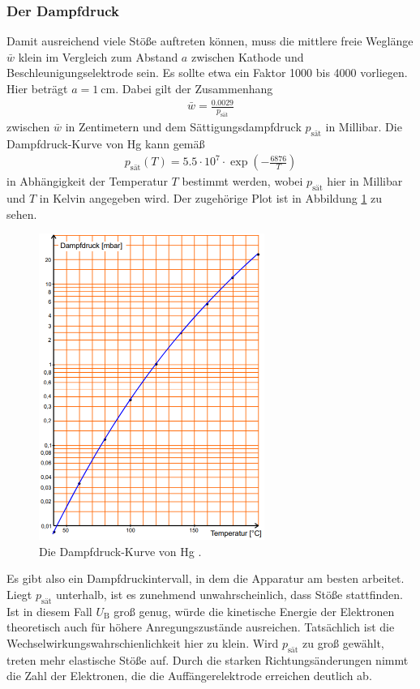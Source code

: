\subsubsection{Der Dampfdruck}
\label{sec:dampfdruck}
Damit ausreichend viele Stöße auftreten können, muss die mittlere freie Weglänge $\bar{w}$ klein im Vergleich zum Abstand $a$ zwischen Kathode und Beschleunigungselektrode sein.
Es sollte etwa ein Faktor 1000 bis 4000 vorliegen.
Hier beträgt $a = \qty{1}{\cm}$.
Dabei gilt der Zusammenhang 
\begin{align}
    \bar{w} = \frac{0.0029}{p_\text{sät}}
    \label{eq:weglaenge}
\end{align} 
zwischen $\bar{w}$ in Zentimetern und dem Sättigungsdampfdruck $p_\text{sät}$ in Millibar.
Die Dampfdruck-Kurve von Hg kann gemäß 
\begin{align}
    p_\text{sät}(T) = \num{5.5} \cdot 10^7 \cdot \exp\left(-\frac{6876}{T}\right)
    \label{eq:dampfdruck}
\end{align}
in Abhängigkeit der Temperatur $T$ bestimmt werden, wobei $p_\text{sät}$ hier in Millibar und $T$ in Kelvin angegeben wird.
Der zugehörige Plot ist in Abbildung \ref{fig:dampfdruck} zu sehen.

\begin{figure}[H]
    \centering
    \includegraphics[height = 10cm]{bilder/dampfdruck.png}
    \caption{Die Dampfdruck-Kurve von Hg \cite{man:v601}.}
    \label{fig:dampfdruck}
\end{figure}

\noindent
Es gibt also ein Dampfdruckintervall, in dem die Apparatur am besten arbeitet.
Liegt $p_\text{sät}$ unterhalb, ist es zunehmend unwahrscheinlich, dass Stöße stattfinden.
Ist in diesem Fall $U_\text{B}$ groß genug, würde die kinetische Energie der Elektronen theoretisch auch für höhere Anregungszustände ausreichen.
Tatsächlich ist die Wechselwirkungswahrschienlichkeit hier zu klein.
Wird $p_\text{sät}$ zu groß gewählt, treten mehr elastische Stöße auf.
Durch die starken Richtungsänderungen nimmt die Zahl der Elektronen, die die Auffängerelektrode erreichen deutlich ab.


